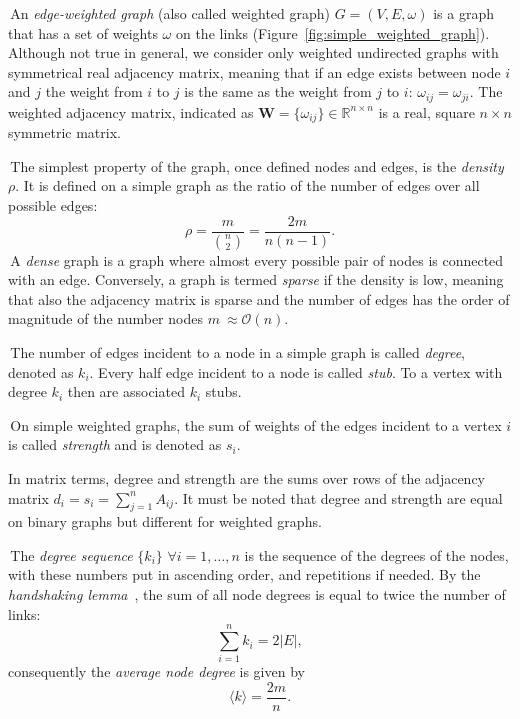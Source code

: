 \noindent\textbullet \,An \emph{edge-weighted graph} (also called weighted graph) $G=(V,E,\omega)$ is a graph that has a set of weights $\omega$ on the links (Figure~\ref{fig:simple_weighted_graph}).
Although not true in general, we consider only weighted undirected graphs with symmetrical real adjacency matrix, meaning that if an edge exists between node $i$ and $j$ the weight from $i$ to $j$ is the same as the weight from $j$ to $i$: $\omega_{ij}=\omega_{ji}$.
The weighted adjacency matrix,  indicated as $\mathbf{W}=\{ \omega_{ij} \} \in \mathbb{R}^{n\times n}$ is a real, square $n \times n$ symmetric matrix.

\noindent\textbullet \,The simplest property of the graph, once defined nodes and edges, is the \emph{density} $\rho$.
It is defined on a simple graph as the ratio of the number of edges over all possible edges:
\begin{equation}
\rho = \frac{m}{\binom{n}{2}} = \frac{2m}{n(n-1)}.
\end{equation}
\noindent\textbullet \,A \emph{dense} graph is a graph where almost every possible pair of nodes is connected with an edge.
Conversely, a graph is termed \emph{sparse} if the density is low, meaning that also the adjacency matrix is sparse and the number of edges has the order of magnitude of the number nodes $m ~\approx \mathcal{O}(n)$.

\noindent\textbullet \,The number of edges incident to a node in a simple graph is called \emph{degree}, denoted as $k_i$.
Every half edge incident to a node is called \emph{stub}.
To a vertex with degree $k_i$ then are associated $k_i$ stubs.

\noindent\textbullet \,On simple weighted graphs, the sum of weights of the edges incident to a vertex $i$ is called \emph{strength} and is denoted as $s_i$.

In matrix terms, degree and strength are the sums over rows of the adjacency matrix $d_i=s_i=\sum_{j=1}^n A_{ij}$.
It must be noted that degree and strength are equal on binary graphs but different for weighted graphs.

\noindent\textbullet \,The \emph{degree sequence} $\{k_i\}$ $\forall i=1,\ldots,n$ is the sequence  of the degrees of the nodes, with these numbers put in ascending order, and repetitions if needed.
By the \emph{handshaking lemma}~\cite{leiserson2001}, the sum of all node degrees is equal to twice the number of links:
\begin{equation}
\label{eq:handshaking_lemma}
\sum_{i=1}^n k_i=2 |E|,
\end{equation}
consequently the \emph{average node degree} is given by
\begin{equation}
\langle  k \rangle = \frac{2m}{n}.
\end{equation}

